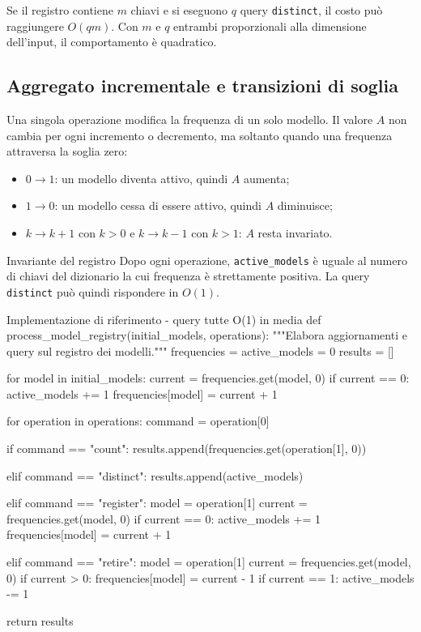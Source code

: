 Se il registro contiene $m$ chiavi e si eseguono $q$ query
\texttt{distinct}, il costo può raggiungere $O(qm)$. Con $m$ e $q$ entrambi
proporzionali alla dimensione dell'input, il comportamento è quadratico.

\subsection{Aggregato incrementale e transizioni di soglia}

Una singola operazione modifica la frequenza di un solo modello. Il valore $A$
non cambia per ogni incremento o decremento, ma soltanto quando una frequenza
attraversa la soglia zero:

\begin{itemize}
  \item $0\rightarrow1$: un modello diventa attivo, quindi $A$ aumenta;
  \item $1\rightarrow0$: un modello cessa di essere attivo, quindi $A$
        diminuisce;
  \item $k\rightarrow k+1$ con $k>0$ e $k\rightarrow k-1$ con $k>1$: $A$
        resta invariato.
\end{itemize}

\begin{principlebox}{Invariante del registro}
Dopo ogni operazione, \texttt{active\_models} è uguale al numero di chiavi del
dizionario la cui frequenza è strettamente positiva. La query
\texttt{distinct} può quindi rispondere in $O(1)$.
\end{principlebox}

\begin{efficientcode}{Implementazione di riferimento - query tutte O(1) in media}
def process_model_registry(initial_models, operations):
    """Elabora aggiornamenti e query sul registro dei modelli."""
    frequencies = {}
    active_models = 0
    results = []

    for model in initial_models:
        current = frequencies.get(model, 0)
        if current == 0:
            active_models += 1
        frequencies[model] = current + 1

    for operation in operations:
        command = operation[0]

        if command == "count":
            results.append(frequencies.get(operation[1], 0))

        elif command == "distinct":
            results.append(active_models)

        elif command == "register":
            model = operation[1]
            current = frequencies.get(model, 0)
            if current == 0:
                active_models += 1
            frequencies[model] = current + 1

        elif command == "retire":
            model = operation[1]
            current = frequencies.get(model, 0)
            if current > 0:
                frequencies[model] = current - 1
                if current == 1:
                    active_models -= 1

    return results
\end{efficientcode}

